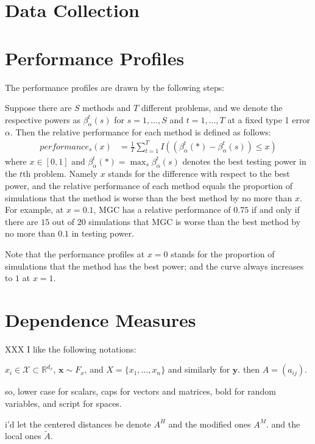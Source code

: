 \documentclass[11pt]{article}
\providecommand{\mt}[1]{\widetilde{#1}}
\providecommand{\mb}[1]{\boldsymbol{#1}}
\providecommand{\mc}[1]{\mathcal{#1}}
\newcommand{\Real}{\mathbb{R}}
\begin{document}
\section{Data Collection}



\section{Performance Profiles}

The performance profiles are drawn by the following steps:

Suppose there are $S$ methods and $T$ different problems, and we denote the respective powers as $\beta_{\alpha}^{t}(s)$ for $s=1,\ldots,S$ and $t=1,\ldots,T$ at a fixed type 1 error $\alpha$. Then the relative performance for each method is defined as follows:
\begin{align*}
performance_{s}(x) &= \frac{1}{T} \sum_{t=1}^{T} I((\beta_{\alpha}^{t}(*)-\beta_{\alpha}^{t}(s)) \leq x)
\end{align*}
where $x \in [0,1]$ and $\beta_{\alpha}^{t}(*) =\max_{s} \beta_{\alpha}^{t}(s)$ denotes the best testing power in the $t$th problem. Namely $x$ stands for the difference with respect to the best power, and the relative performance of each method equals the proportion of simulations that the method is worse than the best method by no more than $x$. For example, at $x=0.1$, MGC has a relative performance of $0.75$ if and only if there are $15$ out of $20$ simulations that MGC is worse than the best method by no more than $0.1$ in testing power. 

Note that the performance profiles at $x=0$ stands for the proportion of simulations that the method has the best power; and the curve always increases to $1$ at $x=1$. 

\section{Dependence Measures}
\label{main}

XXX I like the following notations:

$x_i \in \mc{X} \subset \Real^{d_x}$, $\mb{x} \sim F_x$, and $X=\{x_1,\ldots,x_n\}$ and similarly for $\mb{y}$. then $A=(a_{ij})$. 

so, lower case for scalars, caps for vectors and matrices, bold for random variables, and script for spaces.  

i'd let the centered distances be denote $A^H$ and the modified ones $A^M$.
and the local ones $\mt{A}$.
\end{document}

